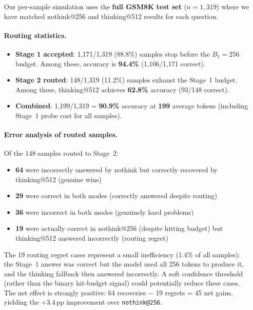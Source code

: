Our per-sample \method{} simulation uses the \textbf{full GSM8K test set}
($n{=}1{,}319$) where we have matched nothink@256 and thinking@512
results for each question.

\paragraph{Routing statistics.}
\begin{itemize}[nosep,leftmargin=*]
    \item \textbf{Stage 1 accepted}: 1{,}171/1{,}319 (88.8\%) samples stop
      before the $B_1{=}256$ budget. Among these, accuracy is
      \textbf{94.4\%} (1{,}106/1{,}171 correct).
    \item \textbf{Stage 2 routed}: 148/1{,}319 (11.2\%) samples exhaust the
      Stage~1 budget. Among these, thinking@512 achieves \textbf{62.8\%}
      accuracy (93/148 correct).
    \item \textbf{Combined}: 1{,}199/1{,}319 = \textbf{90.9\%} accuracy at
      \textbf{199} average tokens (including Stage~1 probe cost for
      all samples).
\end{itemize}

\paragraph{Error analysis of routed samples.}
Of the 148 samples routed to Stage~2:
\begin{itemize}[nosep,leftmargin=*]
    \item \textbf{64} were incorrectly answered by nothink but correctly recovered by thinking@512 (genuine wins)
    \item \textbf{29} were correct in both modes (correctly answered despite routing)
    \item \textbf{36} were incorrect in both modes (genuinely hard problems)
    \item \textbf{19} were actually correct in nothink@256 (despite hitting budget)
      but thinking@512 answered incorrectly (routing regret)
\end{itemize}
The 19 routing regret cases represent a small inefficiency (1.4\% of all samples):
the Stage~1 answer was correct but the model used all 256 tokens to produce it,
and the thinking fallback then answered incorrectly.
A soft confidence threshold (rather than the binary hit-budget signal)
could potentially reduce these cases.
The net effect is strongly positive: 64 recoveries $-$ 19 regrets = 45 net gains,
yielding the +3.4\,pp improvement over \texttt{nothink@256}.

